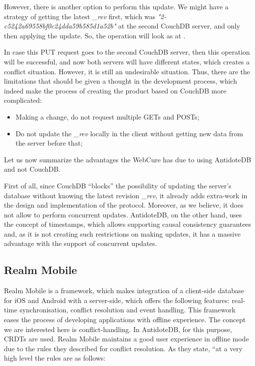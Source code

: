 However, there is another option to perform this update. We might have a strategy of getting the latest \textit{\_rev} first, which was \textit{"2-c5242a69558bf0c24dda59b585d1a52b"} at the second CouchDB server, and only then applying the update. So, the operation will look as at .

In case this PUT request goes to the second CouchDB server, then this operation will be successful, and now both servers will have different states, which creates a conflict situation. 
However, it is still an undesirable situation. Thus, there are the limitations that should be given a thought in the development process, which indeed make the process of creating the product based on CouchDB more complicated:
    \begin{itemize}
        \item {Making a change, do not request multiple GETs and POSTs;}
        \item {Do not update the \textit{\_rev} locally in the client without getting new data from the server before that;}
      \end{itemize}
      
Let us now summarize the advantages the WebCure has due to using AntidoteDB and not CouchDB. 

First of all, since CouchDB ``blocks'' the possibility of updating the server's database without knowing the latest revision \textit{\_rev}, it already adds extra-work in the design and implementation of the protocol. Moreover, as we believe, it does not allow to perform concurrent updates. AntidoteDB, on the other hand, uses the concept of timestamps, which allows supporting causal consistency guarantees and, as it is not creating such restrictions on making updates, it has a massive advantage with the support of concurrent updates. 

\subsection*{Realm Mobile}

Realm Mobile is a framework, which makes integration of a client-side database for iOS and Android with a server-side, which offers the following features: real-time synchronisation, conflict resolution and event handling. This framework eases the process of developing applications with offline experience. The concept we are interested here is conflict-handling. In AntidoteDB, for this purpose, CRDTs are used. Realm Mobile maintains a good user experience in offline mode due to the rules they described for conflict resolution.
As they state, ``at a very high level the rules are as follows:

